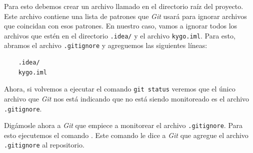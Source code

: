   Para esto debemos crear un archivo llamado  en el directorio raíz del 
  proyecto.
  Este archivo contiene una lista de patrones que \textit{Git} usará para ignorar archivos
  que coincidan con esos patrones.
  En nuestro caso, vamos a ignorar todos los archivos que estén en el directorio \texttt{.idea/} y
  el archivo \texttt{kygo.iml}.
  Para esto, abramos el archivo \texttt{.gitignore} y agreguemos las siguientes líneas:

  \begin{verbatim}
    .idea/
    kygo.iml
  \end{verbatim}

  Ahora, si volvemos a ejecutar el comando \texttt{git status} veremos que el único archivo que
  \textit{Git} nos está indicando que no está siendo monitoreado es el archivo \texttt{.gitignore}.

  Digámosle ahora a \textit{Git} que empiece a monitorear el archivo \texttt{.gitignore}.
  Para esto ejecutemos el comando .
  Este comando le dice a \textit{Git} que agregue el archivo \texttt{.gitignore} al repositorio.

